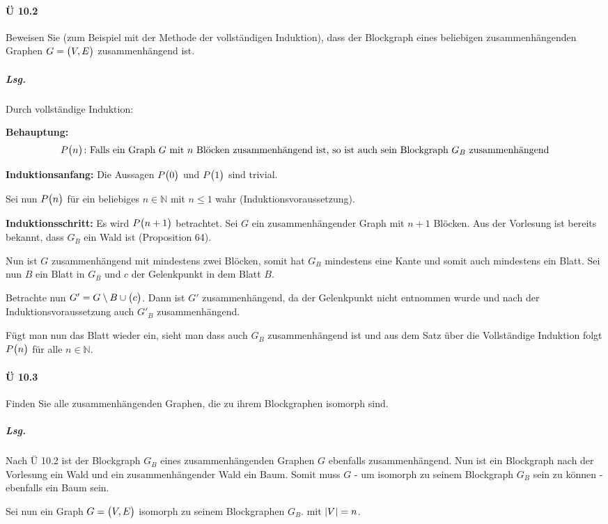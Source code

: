\documentclass{scrreprt}
\begin{document}
\paragraph{Ü 10.2} Beweisen Sie (zum Beispiel mit der Methode der vollständigen
Induktion), dass der Blockgraph eines beliebigen zusammenhängenden Graphen
$G = \qty\big(V, E)$ zusammenhängend ist.

\subparagraph{Lsg.} Durch vollständige Induktion:

\textbf{Behauptung:}
\[
  P\qty\big(n) \colon \text{Falls ein Graph $G$ mit $n$ Blöcken zusammenhängend
    ist, so ist auch sein Blockgraph $G_B$ zusammenhängend}
\]

\textbf{Induktionsanfang:} Die Aussagen $P\qty\big(0)$ und $P\qty\big(1)$ sind trivial.

Sei nun $P\qty\big(n)$ für ein beliebiges $n \in \mathbb{N}$ mit $n \leq 1$ wahr (Induktionsvoraussetzung).

\textbf{Induktionsschritt:} Es wird $P\qty\big(n + 1)$ betrachtet.
Sei $G$ ein zusammenhängender Graph mit $n + 1$ Blöcken.
Aus der Vorlesung ist bereits bekannt, dass $G_B$ ein Wald ist (Proposition 64).

Nun ist $G$ zusammenhängend mit mindestens zwei Blöcken, somit hat $G_B$
mindestens eine Kante und somit auch mindestens ein Blatt.
Sei nun $B$ ein Blatt in $G_B$ und $c$ der Gelenkpunkt in dem Blatt $B$.

Betrachte nun $G' = G \setminus B \cup \qty\big(c)$.
Dann ist $G'$ zusammenhängend, da der Gelenkpunkt nicht entnommen wurde und nach
der Induktionsvoraussetzung auch $G'_B$ zusammenhängend.

Fügt man nun das Blatt wieder ein, sieht man dass auch $G_B$ zusammenhängend ist
und aus dem Satz über die Vollständige Induktion folgt $P\qty\big(n)$ für alle
$n \in \mathbb{N}$.

\newpage
\paragraph{Ü 10.3} Finden Sie alle zusammenhängenden Graphen, die zu ihrem
Blockgraphen isomorph sind.

\subparagraph{Lsg.} Nach Ü 10.2 ist der Blockgraph $G_B$ eines zusammenhängenden
Graphen $G$ ebenfalls zusammenhängend.
Nun ist ein Blockgraph nach der Vorlesung ein Wald und ein zusammenhängender Wald
ein Baum.
Somit muss $G$ - um isomorph zu seinem Blockgraph $G_B$ sein zu können -
ebenfalls ein Baum sein.

Sei nun ein Graph $G = \qty\big(V, E)$ isomorph zu seinem Blockgraphen $G_B$.
mit $\abs{V} = n$.
\end{document}
